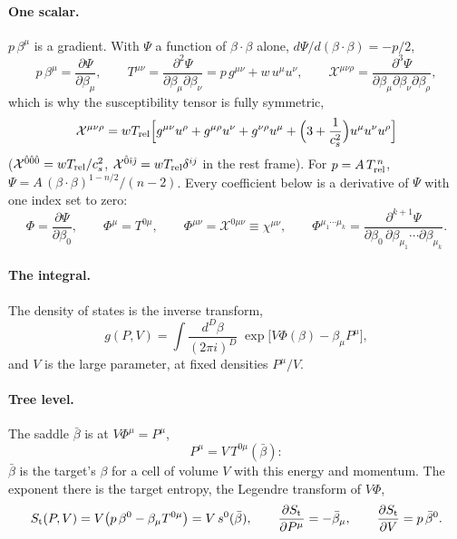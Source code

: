 \documentclass[11pt,aps,preprint,nofootinbib,superscriptaddress,tightenlines]{revtex4-2}
\def\st{\begin{equation}}
\def\stp{\end{equation}}
\let\oldparagraph\paragraph
\renewcommand{\paragraph}{\par\bigskip\oldparagraph}
\begin{document}
\paragraph{One scalar.}  $p\,\beta^\mu$ is a gradient.  With $\Psi$ a function of $\beta\cdot\beta$ alone, $d\Psi/d(\beta\cdot\beta)=-p/2$,
\st
p\,\beta^\mu=\frac{\partial\Psi}{\partial\beta_\mu},\qquad
T^{\mu\nu}=\frac{\partial^2\Psi}{\partial\beta_\mu\partial\beta_\nu}=p\,g^{\mu\nu}+w\,u^\mu u^\nu,\qquad
\mathcal X^{\mu\nu\rho}=\frac{\partial^3\Psi}{\partial\beta_\mu\partial\beta_\nu\partial\beta_\rho} ,
\stp
which is why the susceptibility tensor is fully symmetric,
\st
\mathcal X^{\mu\nu\rho}=wT_{\rm rel}\Big[g^{\mu\nu}u^\rho+g^{\mu\rho}u^\nu+g^{\nu\rho}u^\mu+\Big(3+\frac1{c_s^2}\Big)u^\mu u^\nu u^\rho\Big]
\stp
($\mathcal X^{\hat0\hat0\hat0}=wT_{\rm rel}/c_s^2$, $\mathcal X^{\hat0\hat\imath\hat\jmath}=wT_{\rm rel}\delta^{ij}$ in the rest frame).  For
$p=A\,T_{\rm rel}^{\,n}$, $\Psi=A\,(\beta\cdot\beta)^{1-n/2}/(n-2)$.  Every coefficient below is a derivative of $\Psi$ with one index set to zero:
\st
\Phi=\frac{\partial\Psi}{\partial\beta_0},\qquad \Phi^\mu=T^{0\mu},\qquad \Phi^{\mu\nu}=\mathcal X^{0\mu\nu}\equiv\chi^{\mu\nu},\qquad
\Phi^{\mu_1\cdots\mu_k}=\frac{\partial^{k+1}\Psi}{\partial\beta_0\,\partial\beta_{\mu_1}\cdots\partial\beta_{\mu_k}} .
\stp

\paragraph{The integral.}  The density of states is the inverse transform,
\st
g(P,V)=\int\frac{d^D\beta}{(2\pi i)^D}\;\exp\big[V\Phi(\beta)-\beta_\mu P^\mu\big],
\stp
and $V$ is the large parameter, at fixed densities $P^\mu/V$.

\paragraph{Tree level.}  The saddle $\bar\beta$ is at $V\Phi^\mu=P^\mu$,
\st
P^\mu=V\,T^{0\mu}(\bar\beta) :
\stp
$\bar\beta$ is the target's $\beta$ for a cell of volume $V$ with this energy and momentum.  The exponent there is the target entropy, the Legendre
transform of $V\Phi$,
\st
S_{\rm t}(P,V)=V\big(p\,\beta^0-\beta_\mu T^{0\mu}\big)=V\,s^0(\bar\beta),\qquad
\frac{\partial S_{\rm t}}{\partial P^\mu}=-\bar\beta_\mu,\qquad \frac{\partial S_{\rm t}}{\partial V}=p\,\bar\beta^0 .
\stp
\end{document}

